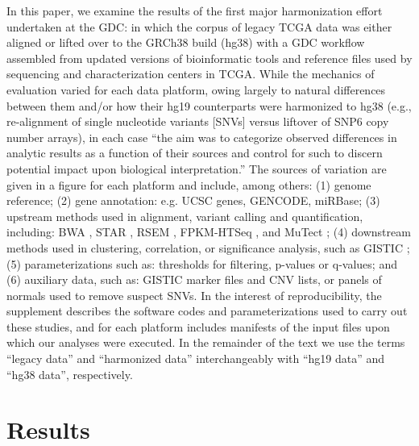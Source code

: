 In this paper, we examine the results of the first major harmonization effort undertaken at the GDC: in which the corpus of legacy TCGA data was either aligned or lifted over to the GRCh38 build (hg38) with a GDC workflow assembled from updated versions of bioinformatic tools and reference files used by sequencing and characterization centers in TCGA. While the mechanics of evaluation varied for each data platform, owing largely to natural differences between them and/or how their hg19 counterparts were harmonized to hg38 (e.g., re-alignment of single nucleotide variants [SNVs] versus liftover of SNP6 copy number arrays), in each case \enquote{the aim was to categorize observed differences in analytic results as a function of their sources and control for such to discern potential impact upon biological interpretation.} The sources of variation are given in a figure for each platform and include, among others: (1) genome reference; (2) gene annotation: e.g. UCSC genes, GENCODE, miRBase; (3) upstream methods used in alignment, variant calling and quantification, including: BWA \cite{lih_durbinr:BWAShortRead2009}, STAR \cite{dobina_gingerastr:STARUltrafast2013}, RSEM \cite{lib_deweycn:RSEMAccurate2011}, FPKM-HTSeq \cite{anderss_huberw:HTSeqPython2015}, and MuTect \cite{cibulskisk_getzg:SensitiveDetection2013}; (4) downstream methods used in clustering, correlation, or significance analysis, such as GISTIC \cite{mermelch_getzg:GISTIC2Facilitates2011}; (5) parameterizations such as: thresholds for filtering, p-values or q-values; and (6) auxiliary data, such as: GISTIC marker files and CNV lists, or panels of normals used to remove suspect SNVs. In the interest of reproducibility, the supplement describes the software codes and parameterizations used to carry out these studies, and for each platform includes manifests of the input files upon which our analyses were executed. In the remainder of the text we use the terms ``legacy data'' and ``harmonized data'' interchangeably with ``hg19 data'' and ``hg38 data'', respectively.


\section{Results}

